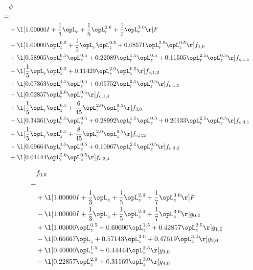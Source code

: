 \begin{alignat}{2} 
\label{eq:scalarFlux_0} 
& \phi \nonumber \\ 
 = \\ 
& + \l[  1.00000 I + \frac{1}{3} \opL_r + \frac{1}{5} \opL_r^{2.0} + \frac{1}{7} \opL_r^{3.0}  \r] F \nonumber \\ 
& - \l[  1.00000 \opL_z^{0.5} + \frac{1}{5} \opL_r \opL_z^{0.5} +  0.08571 \opL_r^{2.0} \opL_z^{0.5}  \r] f_{1,0} \nonumber \\ 
& + \l[  0.58905 \opL_r^{0.5} \opL_z^{0.5} +  0.22089 \opL_r^{1.5} \opL_z^{0.5} +  0.11505 \opL_r^{2.5} \opL_z^{0.5}  \r] f_{c,1,1} \nonumber \\ 
& - \l[ \frac{1}{5} \opL_r \opL_z^{0.5} +  0.11429 \opL_r^{2.0} \opL_z^{0.5}  \r] f_{c,1,2} \nonumber \\ 
& + \l[  0.07363 \opL_r^{1.5} \opL_z^{0.5} +  0.05752 \opL_r^{2.5} \opL_z^{0.5}  \r] f_{c,1,3} \nonumber \\ 
& - \l[  0.02857 \opL_r^{2.0} \opL_z^{0.5}  \r] f_{c,1,4} \nonumber \\ 
& + \l[ \frac{1}{5} \opL_r \opL_z^{0.5} + \frac{6}{45} \opL_r^{2.0} \opL_z^{0.5}  \r] f_{3,0} \nonumber \\ 
& - \l[  0.34361 \opL_r^{0.5} \opL_z^{0.5} +  0.28992 \opL_r^{1.5} \opL_z^{0.5} +  0.20133 \opL_r^{2.5} \opL_z^{0.5}  \r] f_{c,3,1} \nonumber \\ 
& + \l[ \frac{1}{5} \opL_r \opL_z^{0.5} + \frac{8}{45} \opL_r^{2.0} \opL_z^{0.5}  \r] f_{c,3,2} \nonumber \\ 
& - \l[  0.09664 \opL_r^{1.5} \opL_z^{0.5} +  0.10067 \opL_r^{2.5} \opL_z^{0.5}  \r] f_{c,3,3} \nonumber \\ 
& + \l[  0.04444 \opL_r^{2.0} \opL_z^{0.5}  \r] f_{c,3,4} \nonumber \\ 
\end{alignat} 


\begin{alignat}{2} 
\label{eq:f_00_0} 
& f_{0,0} \nonumber \\ 
 = \\ 
& + \l[  1.00000 I + \frac{1}{3} \opL_z + \frac{1}{5} \opL_z^{2.0} + \frac{1}{7} \opL_z^{3.0}  \r] F \nonumber \\ 
& - \l[  1.00000 I + \frac{1}{3} \opL_z + \frac{1}{5} \opL_z^{2.0} + \frac{1}{7} \opL_z^{3.0}  \r] g_{0,0} \nonumber \\ 
& + \l[  1.00000 \opL_z^{0.5} +  0.60000 \opL_z^{1.5} +  0.42857 \opL_z^{2.5}  \r] g_{1,0} \nonumber \\ 
& - \l[  0.66667 \opL_z +  0.57143 \opL_z^{2.0} +  0.47619 \opL_z^{3.0}  \r] g_{2,0} \nonumber \\ 
& + \l[  0.40000 \opL_z^{1.5} +  0.44444 \opL_z^{2.5}  \r] g_{3,0} \nonumber \\ 
& - \l[  0.22857 \opL_z^{2.0} +  0.31169 \opL_z^{3.0}  \r] g_{4,0} \nonumber \\ 
\end{alignat} 


